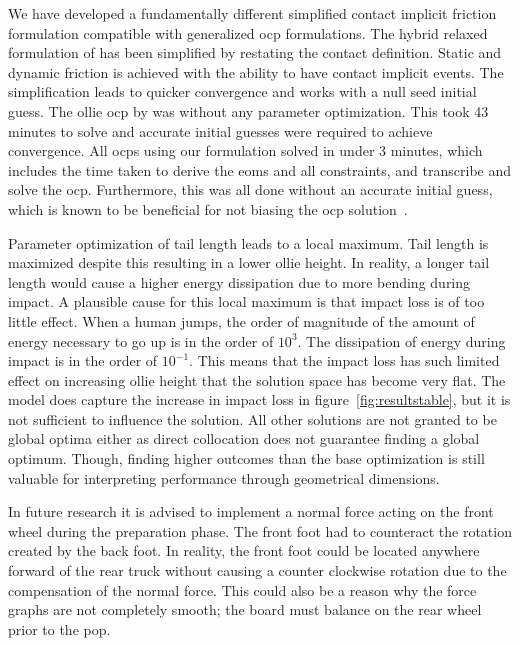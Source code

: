 \documentclass[default,iicol]{sn-jnl}
\begin{document}
We have developed a fundamentally different simplified contact implicit friction formulation compatible with generalized \gls{ocp} formulations.
The hybrid relaxed formulation of \citet{patel_contact-implicit_2019} has been simplified by restating the contact definition.
Static and dynamic friction is achieved with the ability to have contact implicit events.
The simplification leads to quicker convergence and works with a null seed initial guess.
The ollie \gls{ocp} by \citet{shield_contact-implicit_2022} was without any parameter optimization.
This took 43 minutes to solve and accurate initial guesses were required to achieve convergence.
All \glspl{ocp} using our formulation solved in under 3 minutes, which includes the time taken to derive the \glspl{eom} and all constraints, and transcribe and solve the \gls{ocp}.
Furthermore, this was all done without an accurate initial guess, which is known to be beneficial for not biasing the \gls{ocp} solution~\cite{betts_practical_2010}.

Parameter optimization of tail length leads to a local maximum.
Tail length is maximized despite this resulting in a lower ollie height.
In reality, a longer tail length would cause a higher energy dissipation due to more bending during impact.
A plausible cause for this local maximum is that impact loss is of too little effect.
When a human jumps, the order of magnitude of the amount of energy necessary to go up is in the order of $10^3$. The dissipation of energy during impact is in the order of $10^{-1}$.
This means that the impact loss has such limited effect on increasing ollie height that the solution space has become very flat.
The model does capture the increase in impact loss in figure~\ref{fig:resultstable}, but it is not sufficient to influence the solution.
All other solutions are not granted to be global optima either as direct collocation does not guarantee finding a global optimum.
Though, finding higher outcomes than the base optimization is still valuable for interpreting performance through geometrical dimensions.

In future research it is advised to implement a normal force acting on the front wheel during the preparation phase.
The front foot had to counteract the rotation created by the back foot. 
In reality, the front foot could be located anywhere forward of the rear truck without causing a counter clockwise rotation due to the compensation of the normal force.
This could also be a reason why the force graphs are not completely smooth; the board must balance on the rear wheel prior to the pop.
 
\end{document}
